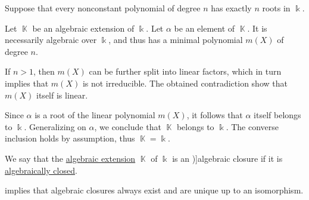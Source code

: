 \begin{defproof}
   Suppose that every nonconstant polynomial of degree \( n \) has exactly \( n \) roots in \( \Bbbk \).

  Let \( \BbbK \) be an algebraic extension of \( \Bbbk \). Let \( \alpha \) be an element of \( \BbbK \). It is necessarily algebraic over \( \Bbbk \), and thus has a minimal polynomial \( m(X) \) of degree \( n \).

  If \( n > 1 \), then \( m(X) \) can be further split into linear factors, which in turn implies that \( m(X) \) is not irreducible. The obtained contradiction show that \( m(X) \) itself is linear.

  Since \( \alpha \) is a root of the linear polynomial \( m(X) \), it follows that \( \alpha \) itself belongs to \( \Bbbk \). Generalizing on \( \alpha \), we conclude that \( \BbbK \) belongs to \( \Bbbk \). The converse inclusion holds by assumption, thus \( \BbbK = \Bbbk \).
\end{defproof}

\begin{definition}\label{def:algebraic_closure}
  We say that the \hyperref[def:algebraic_extension]{algebraic extension} \( \BbbK \) of \( \Bbbk \) is an \term[ru=алгебраическое замыкание (\cite[412]{Винберг2014КурсАлгебры})]{algebraic closure} if it is \hyperref[def:algebraically_closed_field]{algebraically closed}.
\end{definition}
\begin{comments}
  \item {} implies that algebraic closures always exist and are unique up to an isomorphism.
\end{comments}

